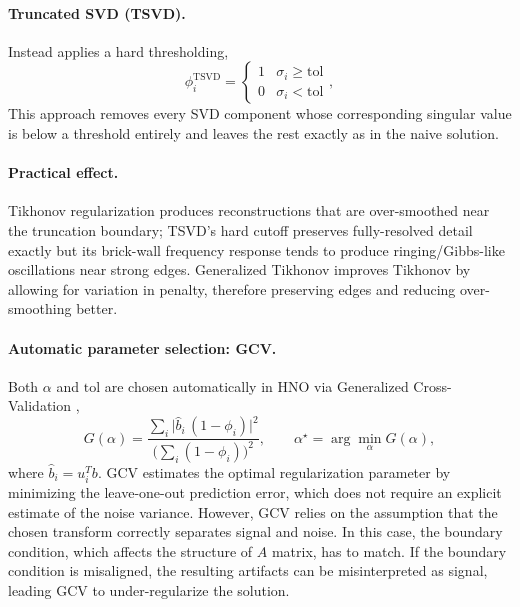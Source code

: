 \documentclass[12pt, a4paper, onecolumn]{article}
\theoremstyle{plain}          %
\theoremstyle{definition}     %
\theoremstyle{remark}
\begin{document}
\paragraph{Truncated SVD (TSVD).} Instead applies a hard thresholding,
\begin{equation}
    \phi_i^{\text{TSVD}} =
    \begin{cases}
        1 & \sigma_i\ge\text{tol} \\
        0 & \sigma_i<\text{tol}
    \end{cases},
    \label{eq:tsvd-filter}
\end{equation}
This approach removes every SVD component whose corresponding singular value is below a threshold entirely and
leaves the rest exactly as in the naive solution.

\paragraph{Practical effect.} Tikhonov regularization produces
reconstructions that are over-smoothed near the truncation
boundary; TSVD's hard cutoff preserves fully-resolved detail exactly but
its brick-wall frequency response tends to produce ringing/Gibbs-like
oscillations near strong edges. Generalized Tikhonov improves Tikhonov by allowing for variation in penalty, therefore preserving edges and reducing over-smoothing better.

\paragraph{Automatic parameter selection: GCV.} Both $\alpha$ and
$\text{tol}$ are chosen automatically in HNO via Generalized
Cross-Validation \cite{golub1979},
\begin{equation}
    G(\alpha) = \frac{\sum_i\big|\hat b_i\,(1-\phi_i)\big|^2}
    {\Big(\sum_i(1-\phi_i)\Big)^2},
    \qquad \alpha^\star = \arg\min_\alpha G(\alpha),
    \label{eq:gcv}
\end{equation}
where $\hat b_i=u_i^Tb$. GCV estimates the optimal regularization parameter by minimizing the leave-one-out prediction error, which does not require an explicit estimate of the noise variance. However, GCV relies on the assumption that the chosen transform correctly separates signal and noise. In this case, the boundary condition, which affects the structure of $A$ matrix, has to match. If the boundary condition is misaligned, the resulting artifacts can be misinterpreted as signal, leading GCV to under-regularize the solution.
\end{document}
